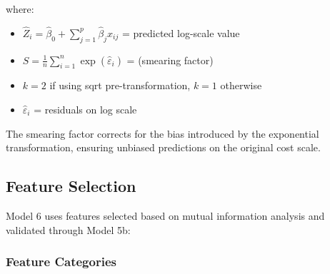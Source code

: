 where:
\begin{itemize}
    \item $\hat{Z}_i = \hat{\beta}_0 + \sum_{j=1}^{p} \hat{\beta}_j x_{ij}$ = predicted log-scale value
    \item $S = \frac{1}{n}\sum_{i=1}^{n}\exp(\hat{\varepsilon}_i)$ = \ModelSixSmearingFactor{} (smearing factor)
    \item $k = 2$ if using sqrt pre-transformation, $k = 1$ otherwise
    \item $\hat{\varepsilon}_i$ = residuals on log scale
\end{itemize}

The smearing factor corrects for the bias introduced by the exponential transformation, ensuring unbiased predictions on the original cost scale.

\subsection{Feature Selection}

Model 6 uses \ModelSixNRobustFeatures{} features selected based on mutual information analysis and validated through Model 5b:

\subsubsection{Feature Categories}

